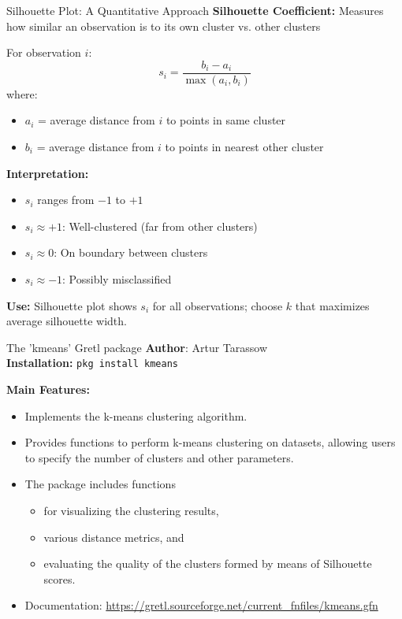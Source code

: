 \documentclass[11pt]{beamer}
\begin{document}
\begin{frame}[fragile]{Silhouette Plot: A Quantitative Approach}
	\textbf{Silhouette Coefficient:} Measures how similar an observation is to its own cluster vs. other clusters

	\vspace{0.1cm}

	For observation $i$:
	\begin{equation}
		s_i = \frac{b_i - a_i}{\max(a_i, b_i)}
	\end{equation}
	where:
	\begin{itemize}
		\small
		\setlength{\itemsep}{0.1cm}
		\item $a_i$ = average distance from $i$ to points in same cluster
		\item $b_i$ = average distance from $i$ to points in nearest other cluster
	\end{itemize}

	\vspace{0.cm}

	\textbf{Interpretation:}
	\begin{itemize}
		\setlength{\itemsep}{0.15cm}
		\item $s_i$ ranges from $-1$ to $+1$
		\item $s_i \approx +1$: Well-clustered (far from other clusters)
		\item $s_i \approx 0$: On boundary between clusters
		\item $s_i \approx -1$: Possibly misclassified
	\end{itemize}

	\vspace{0.2cm}

	\textbf{Use:} Silhouette plot shows $s_i$ for all observations; choose $k$ that maximizes average silhouette width.
\end{frame}


\begin{frame}{The 'kmeans' Gretl package}
	\textbf{Author}: Artur Tarassow\\
	\textbf{Installation:} \texttt{pkg install kmeans}
	\medskip

	\textbf{Main Features:}
	\begin{itemize}
		\item Implements the k-means clustering algorithm.
		\item Provides functions to perform k-means clustering on datasets, allowing users to specify the number of clusters and other parameters.
		\item The package includes functions
		\begin{itemize}
			\item for visualizing the clustering results,
			\item various distance metrics, and
			\item evaluating the quality of the clusters formed by means of Silhouette scores.
		\end{itemize}
		\item Documentation: \url{https://gretl.sourceforge.net/current_fnfiles/kmeans.gfn}
	\end{itemize}
\end{frame}
\end{document}
